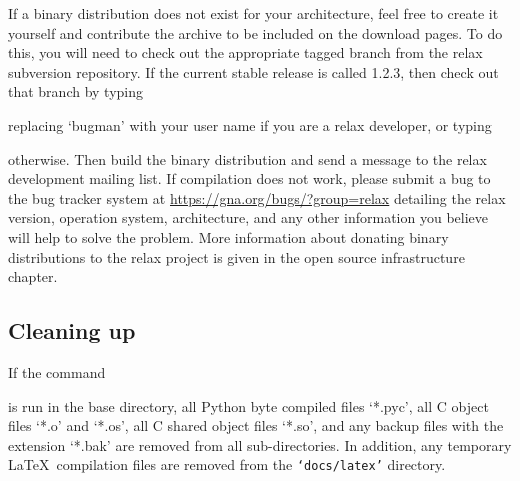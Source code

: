 
If a binary distribution does not exist for your architecture, feel free to create it yourself and contribute the archive to be included on the download pages.  To do this, you will need to check out the appropriate tagged branch from the relax subversion repository.  If the current stable release is called 1.2.3, then check out that branch by typing


replacing `bugman' with your user name if you are a relax developer, or typing


otherwise.  Then build the binary distribution and send a message to the relax development mailing list.  If compilation does not work, please submit a bug to the bug tracker system at \href{https://gna.org/bugs/?group=relax}{https://gna.org/bugs/?group=relax} detailing the relax version, operation system, architecture, and any other information you believe will help to solve the problem.  More information about donating binary distributions to the relax project is given in the open source infrastructure chapter.


\subsection{Cleaning up}

If the command


is run in the base directory, all Python byte compiled files `*.pyc', all C object files `*.o' and `*.os', all C shared object files `*.so', and any backup files with the extension `*.bak' are removed from all sub-directories.  In addition, any temporary \LaTeX\ compilation files are removed from the \texttt{`docs/latex'} directory.
